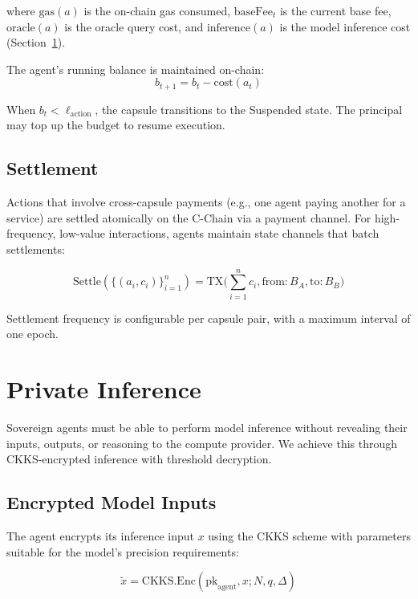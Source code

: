 \documentclass[11pt,a4paper]{article}
\begin{document}
where $\text{gas}(a)$ is the on-chain gas consumed, $\text{baseFee}_t$ is the current base fee, $\text{oracle}(a)$ is the oracle query cost, and $\text{inference}(a)$ is the model inference cost (Section~\ref{sec:private-inference}).

The agent's running balance is maintained on-chain:
\begin{equation}\label{eq:balance}
    b_{t+1} = b_t - \text{cost}(a_t)
\end{equation}

When $b_t < \ell_{\text{action}}$, the capsule transitions to the Suspended state. The principal may top up the budget to resume execution.

\subsection{Settlement}

Actions that involve cross-capsule payments (e.g., one agent paying another for a service) are settled atomically on the C-Chain via a payment channel. For high-frequency, low-value interactions, agents maintain state channels that batch settlements:

\begin{equation}\label{eq:settlement}
    \text{Settle}(\{(a_i, c_i)\}_{i=1}^{n}) = \text{TX}\Big(\sum_{i=1}^{n} c_i, \text{from}: B_A, \text{to}: B_B\Big)
\end{equation}

Settlement frequency is configurable per capsule pair, with a maximum interval of one epoch.

\section{Private Inference}\label{sec:private-inference}

Sovereign agents must be able to perform model inference without revealing their inputs, outputs, or reasoning to the compute provider. We achieve this through CKKS-encrypted inference with threshold decryption.

\subsection{Encrypted Model Inputs}

The agent encrypts its inference input $x$ using the CKKS scheme with parameters suitable for the model's precision requirements:

\begin{equation}\label{eq:enc-input}
    \tilde{x} = \text{CKKS.Enc}(\text{pk}_{\text{agent}}, x; N, q, \Delta)
\end{equation}
\end{document}
